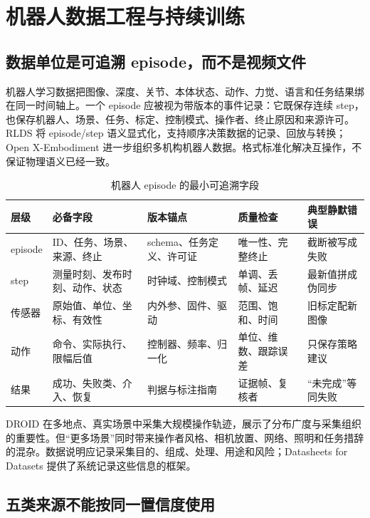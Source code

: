 \chapter{机器人数据工程与持续训练}
\label{chap:robot-data-engineering}

\section{数据单位是可追溯 episode，而不是视频文件}

机器人学习数据把图像、深度、关节、本体状态、动作、力觉、语言和任务结果绑在同一时间轴上。一个 episode 应被视为带版本的事件记录：它既保存连续 step，也保存机器人、场景、任务、标定、控制模式、操作者、终止原因和来源许可。RLDS 将 episode/step 语义显式化，支持顺序决策数据的记录、回放与转换\cite{ramos2021rlds}；Open X-Embodiment 进一步组织多机构机器人数据\cite{openx2024}。格式标准化解决互操作，不保证物理语义已经一致。

\begin{table}[H]
\centering
\caption{机器人 episode 的最小可追溯字段}
\label{tab:episode-schema}
\begin{tabularx}{\textwidth}{p{}YYYY}
\toprule
层级 & 必备字段 & 版本锚点 & 质量检查 & 典型静默错误 \\
\midrule
episode & ID、任务、场景、来源、终止 & schema、任务定义、许可证 & 唯一性、完整终止 & 截断被写成失败 \\
step & 测量时刻、发布时刻、动作、状态 & 时钟域、控制模式 & 单调、丢帧、延迟 & 最新值拼成伪同步 \\
传感器 & 原始值、单位、坐标、有效性 & 内外参、固件、驱动 & 范围、饱和、时间 & 旧标定配新图像 \\
动作 & 命令、实际执行、限幅后值 & 控制器、频率、归一化 & 单位、维数、跟踪误差 & 只保存策略建议 \\
结果 & 成功、失败类、介入、恢复 & 判据与标注指南 & 证据帧、复核者 & “未完成”等同失败 \\
\bottomrule
\end{tabularx}
\end{table}

DROID 在多地点、真实场景中采集大规模操作轨迹，展示了分布广度与采集组织的重要性\cite{khazatsky2024droid}。但“更多场景”同时带来操作者风格、相机放置、网络、照明和任务措辞的混杂。数据说明应记录采集目的、组成、处理、用途和风险；Datasheets for Datasets 提供了系统记录这些信息的框架\cite{gebru2021datasheets}。

\section{五类来源不能按同一置信度使用}


